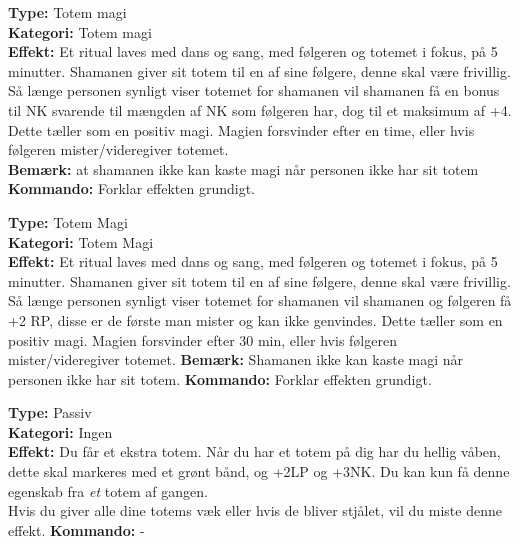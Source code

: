 \begin{orleks arv*}
\textbf{Type:} Totem magi\\
\textbf{Kategori:} Totem magi\\
\textbf{Effekt:} Et ritual laves med dans og sang, med følgeren og totemet i fokus, på 5 minutter.
Shamanen giver sit totem til en af sine følgere, denne skal være frivillig. Så længe personen synligt viser totemet for shamanen vil shamanen få en bonus til NK svarende til mængden af NK som følgeren har, dog til et maksimum af +4. Dette tæller som en positiv magi. Magien forsvinder efter en time, eller hvis følgeren mister/videregiver totemet.\\ 
\textbf{Bemærk:} at shamanen ikke kan kaste magi når personen ikke har sit totem
\textbf{Kommando:} Forklar effekten grundigt.
\end{orleks arv*}

\begin{orleks arv*}
\textbf{Type:} Totem Magi\\
\textbf{Kategori:} Totem Magi\\
\textbf{Effekt:} Et ritual laves med dans og sang, med følgeren og totemet i fokus, på 5 minutter.
Shamanen giver sit totem til en af sine følgere, denne skal være frivillig. Så længe personen synligt viser totemet for shamanen vil shamanen og følgeren få +2 RP, disse er de første man mister og kan ikke genvindes. Dette tæller som en positiv magi. Magien forsvinder efter 30 min, eller hvis følgeren mister/videregiver totemet.
\textbf{Bemærk:} Shamanen ikke kan kaste magi når personen ikke har sit totem.
\textbf{Kommando:} Forklar effekten grundigt.
\end{orleks arv*}

\begin{orleks arv*}
\textbf{Type:} Passiv\\
\textbf{Kategori:} Ingen\\
\textbf{Effekt:} Du får et ekstra totem. Når du har et totem på dig har du hellig våben, dette skal markeres med et grønt bånd, og +2LP og +3NK. Du kan kun få denne egenskab fra \emph{et} totem af gangen.\\
Hvis du giver alle dine totems væk eller hvis de bliver stjålet, vil du miste denne effekt.
\textbf{Kommando:} -
\end{orleks arv*}

